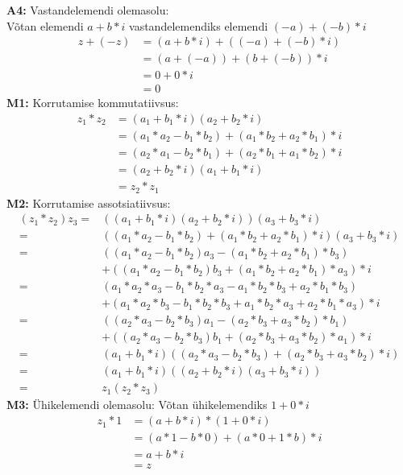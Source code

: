 \documentclass{article}
\begin{document}
\textbf{A4:} Vastandelemendi olemasolu:\\
Võtan elemendi $a+b*i$ vastandelemendiks elemendi $(-a)+(-b)*i$
\begin {equation*}
\begin {aligned}
z+(-z)&=(a+b*i)+((-a)+(-b)*i)\\
&=(a+(-a))+(b+(-b))*i\\
&=0+0*i\\
&=0
\end {aligned}
\end {equation*}
\textbf{M1:} Korrutamise kommutatiivsus:
\begin {equation*}
\begin {aligned}
z_1*z_2&=(a_1+b_1*i)(a_2+b_2*i)\\
&=(a_1*a_2-b_1*b_2)+(a_1*b_2+a_2*b_1)*i\\
&=(a_2*a_1-b_2*b_1)+(a_2*b_1+a_1*b_2)*i\\
&=(a_2+b_2*i)(a_1+b_1*i)\\
&=z_2*z_1
\end {aligned}
\end {equation*}
\textbf{M2:} Korrutamise assotsiatiivsus:
\begin {equation*}
\begin {aligned}
(z_1*z_2)z_3=&((a_1+b_1*i)(a_2+b_2*i))(a_3+b_3*i)\\
=&((a_1*a_2-b_1*b_2)+(a_1*b_2+a_2*b_1)*i)(a_3+b_3*i)\\
=&((a_1*a_2-b_1*b_2)a_3-(a_1*b_2+a_2*b_1)*b_3)\\&+((a_1*a_2-b_1*b_2)b_3+(a_1*b_2+a_2*b_1)*a_3)*i\\
=&(a_1*a_2*a_3-b_1*b_2*a_3-a_1*b_2*b_3+a_2*b_1*b_3)\\&+(a_1*a_2*b_3-b_1*b_2*b_3+a_1*b_2*a_3+a_2*b_1*a_3)*i\\
=&((a_2*a_3-b_2*b_3)a_1-(a_2*b_3+a_3*b_2)*b_1)\\&+((a_2*a_3-b_2*b_3)b_1+(a_2*b_3+a_3*b_2)*a_1)*i\\
=&(a_1+b_1*i)((a_2*a_3-b_2*b_3)+(a_2*b_3+a_3*b_2)*i)\\
=&(a_1+b_1*i)((a_2+b_2*i)(a_3+b_3*i))\\
=&z_1(z_2*z_3)
\end {aligned}
\end {equation*}
\textbf{M3:} Ühikelemendi olemasolu:
Võtan ühikelemendiks $1+0*i$
\begin {equation*}
\begin {aligned}
z_1*1&=(a+b*i)*(1+0*i)\\
&=(a*1-b*0)+(a*0+1*b)*i\\
&=a+b*i\\
&=z
\end {aligned}
\end {equation*}
\end{document}
